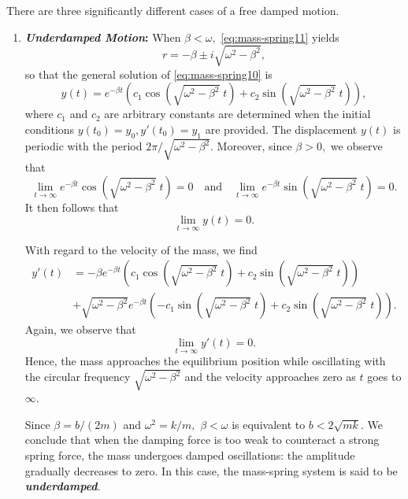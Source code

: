 There are three significantly different cases of a free damped motion. 
\begin{enumerate}[leftmargin=1.5em,label = (\arabic*)]
	\item\label{item:damping2}\textbf{\textit{Underdamped Motion}:}  When $\beta <\omega,$  \eqref{eq:mass-spring11} yields  \[r = - \beta \pm i \sqrt{\omega^2- \beta^2},\] so that the general solution of \eqref{eq:mass-spring10} is
	\[y(t) =  e^{-\beta t}\left(c_1\cos(\sqrt{\omega^2- \beta^2}\; t)+ c_2 \sin(\sqrt{\omega^2- \beta^2}\; t)\right),\] where $c_1$ and $c_2$ are arbitrary constants are determined when the initial conditions $y(t_0) = y_0,  y'(t_0) = y_1$ are provided.  
	The displacement $y(t)$ is periodic with the period $ 2\pi/\sqrt{\omega^2- \beta^2}.$  Moreover, 
	since $\beta >0,$ we observe that  \[\lim\limits_{t\to\infty} e^{-\beta t}\cos(\sqrt{\omega^2- \beta^2}\; t)=0 \quad \mbox{and} \quad \lim\limits_{t\to\infty}e^{-\beta t}\sin(\sqrt{\omega^2- \beta^2}\; t)=0.\]
	It then follows that 
	\[\lim\limits_{t\to\infty} y(t)=0.\] 
	
	
	With regard to the velocity of the mass, we find
		\[\begin{split}
	y'(t) &= -\beta e^{-\beta t}\left(c_1\cos(\sqrt{\omega^2- \beta^2}\; t)+ c_2 \sin(\sqrt{\omega^2- \beta^2}\; t)\right)\\
	& + \sqrt{\omega^2- \beta^2}e^{-\beta t}\left(-c_1\sin (\sqrt{\omega^2- \beta^2}\; t)+ c_2 \sin(\sqrt{\omega^2- \beta^2}\; t)\right).
	\end{split}
	\]
	Again, we observe that
	\[\lim\limits_{t\to\infty} y'(t)=0.\]  Hence, the mass approaches the equilibrium position while oscillating with the circular frequency \(\sqrt{\omega^2- \beta^2}\) and the velocity approaches zero as $t$ goes to $\infty.$
	
	Since $\beta = b/(2m)$ and $\omega^2 = k/m,$ $\beta < \omega$ is equivalent to $b< 2\sqrt{mk}.$ 
	We conclude that when the damping force is too weak to counteract a strong spring force, the mass undergoes damped oscillations: the amplitude  gradually decreases to zero. In this case, the mass-spring system is said to be \textbf{\textit{underdamped}}.
	

\end{enumerate}
